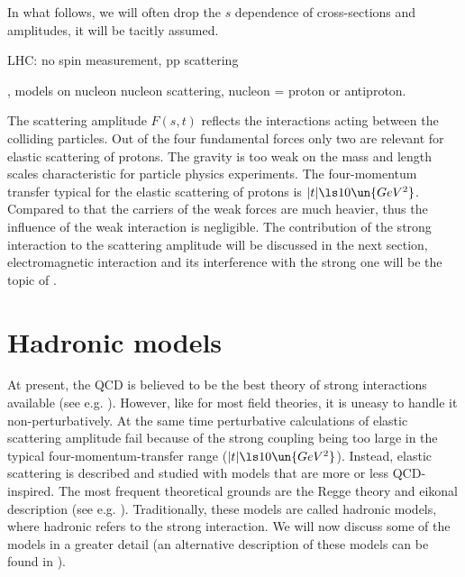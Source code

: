 In what follows, we will often drop the $s$ dependence of cross-sections and amplitudes, it will be tacitly assumed.

\> LHC: no spin measurement, pp scattering


, models on nucleon nucleon scattering, nucleon = proton or antiproton.


\iffalse
cross-section def (norm)
si = |F|^2
Opt Theorem
crossing sym
(QCD - Chyla)

\bref{formanek QM}
\bref{formanek QFT}
\bref{peskin}
\bref{barone}
\fi


The scattering amplitude $F(s, t)$ reflects the interactions acting between the colliding particles. Out of the four fundamental forces only two are relevant for elastic scattering of protons. The gravity is too weak on the mass and length scales characteristic for particle physics experiments. The four-momentum transfer typical for the elastic scattering of protons is $|t| \ls 10\un{GeV^2}$. Compared to that the carriers of the weak forces are much heavier, thus the influence of the weak interaction is negligible. The contribution of the strong interaction to the scattering amplitude will be discussed in the next section, electromagnetic interaction and its interference with the strong one will be the topic of .

\section[el models]{Hadronic models}

At present, the QCD is believed to be the best theory of strong interactions available (see e.g. ). However, like for most field theories, it is uneasy to handle it non-perturbatively. At the same time perturbative calculations of elastic scattering amplitude fail because of the strong coupling being too large in the typical four-momentum-transfer range ($|t| \ls 10\un{GeV^2}$). Instead, elastic scattering is described and studied with models that are more or less QCD-inspired. The most frequent theoretical grounds are the Regge theory and eikonal description (see e.g. ). Traditionally, these models are called hadronic models, where hadronic refers to the strong interaction. We will now discuss some of the models in a greater detail (an alternative description of these models can be found in ).

